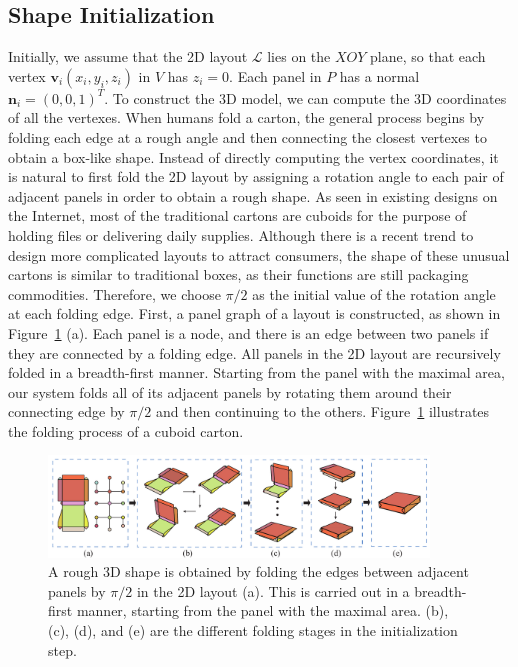 
\subsection{Shape Initialization}
\label{sec:initialization}


Initially, we assume that the 2D layout $\mathcal{L}$ lies on the $XOY$ plane, so that each vertex $\mathbf{v}_i(x_i,y_i,z_i)$ in $V$ has $z_i=0$. 
Each panel in $P$ has a normal $\mathbf{n}_i=(0,0,1)^T$. 
To construct the 3D model, we can compute the 3D coordinates of all the vertexes. 
%
When humans fold a carton, the general process begins by folding each edge at a rough angle and then connecting the closest vertexes to obtain a box-like shape. 
%
Instead of directly computing the vertex coordinates, it is natural to first fold the 2D layout by assigning a rotation angle to each pair of adjacent panels in order to obtain a rough shape.
%
As seen in existing designs on the Internet, most of the traditional cartons are cuboids for the purpose of holding files or delivering daily supplies. 
Although there is a recent trend to design more complicated layouts to attract consumers, the shape of these unusual cartons is similar to traditional boxes, as their functions are still packaging commodities. 
%
Therefore, we choose $\pi/2$ as the initial value of the rotation angle at each folding edge. 
%
First, a panel graph of a layout is constructed, as shown in Figure~\ref{fig:midresult} (a).
Each panel is a node, and there is an edge between two panels if they are connected by a folding edge.
%
All panels in the 2D layout are recursively folded in a breadth-first manner.
Starting from the panel with the maximal area, our system folds all of its adjacent panels by rotating them around their connecting edge by $\pi/2$ and then continuing to the others. 
Figure~\ref{fig:midresult} illustrates the folding process of a cuboid carton. 

\begin{figure}
	\centering
	\includegraphics[width=0.9\textwidth]{images/midresult}
	\caption{A rough 3D shape is obtained by folding the edges between adjacent panels by $\pi/2$ in the 2D layout (a). This is carried out in a breadth-first manner, starting from the panel with the maximal area. (b), (c), (d), and (e) are the different folding stages in the initialization step.}
	\label{fig:midresult}
\end{figure}



